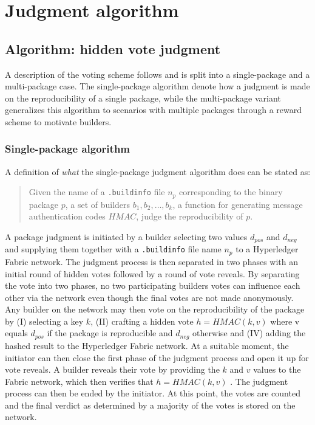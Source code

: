 \chapter{Judgment algorithm}

\section{Algorithm: hidden vote judgment}

A description of the voting scheme follows and is split into a single-package and a multi-package case. The single-package algorithm denote how a judgment is made on the reproducibility of a single package, while the multi-package variant generalizes this algorithm to scenarios with multiple packages through a reward scheme to motivate builders.

\subsection{Single-package algorithm}
\label{subsec:AlgorithmSingle}

A definition of \textit{what} the single-package judgment algorithm does can be stated as:

\begin{quote}
	Given the name of a \texttt{.buildinfo} file $n_p$ corresponding to the binary package $p$, a set of builders $b_1, b_2, \dotsc, b_k$, a function for generating message authentication codes $HMAC$, judge the reproducibility of $p$.
\end{quote}

A package judgment is initiated by a builder selecting two values $d_{pos}$ and $d_{neg}$ and supplying them together with a \texttt{.buildinfo} file name $n_p$ to a Hyperledger Fabric network. The judgment process is then separated in two phases with an initial round of hidden votes followed by a round of vote reveals. By separating the vote into two phases, no two participating builders votes can influence each other via the network even though the final votes are not made anonymously. Any builder on the network may then vote on the reproducibility of the package by (I) selecting a key $k$, (II) crafting a hidden vote $h = HMAC(k, v)$ where v equals $d_{pos}$ if the package is reproducible and $d_{neg}$ otherwise and (IV) adding the hashed result to the Hyperledger Fabric network. At a suitable moment, the initiator can then close the first phase of the judgment process and open it up for vote reveals. A builder reveals their vote by providing the $k$ and $v$ values to the Fabric network, which then verifies that $h = HMAC(k, v)$ . The judgment process can then be ended by the initiator. At this point, the votes are counted and the final verdict as determined by a majority of the votes is stored on the network.

